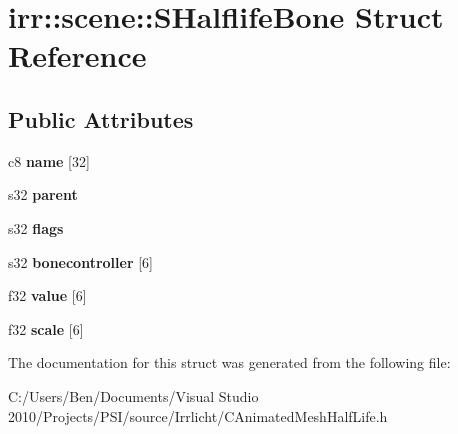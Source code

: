 \hypertarget{structirr_1_1scene_1_1_s_halflife_bone}{\section{irr\-:\-:scene\-:\-:S\-Halflife\-Bone Struct Reference}
\label{structirr_1_1scene_1_1_s_halflife_bone}
}
\subsection*{Public Attributes}
\begin{DoxyCompactItemize}
\item 
\hypertarget{structirr_1_1scene_1_1_s_halflife_bone_ad101b8aea9a2e61d6473b677dbaf8062}{c8 {\bfseries name} \mbox{[}32\mbox{]}}\label{structirr_1_1scene_1_1_s_halflife_bone_ad101b8aea9a2e61d6473b677dbaf8062}

\item 
\hypertarget{structirr_1_1scene_1_1_s_halflife_bone_a8c5e65db08a6ff4079ff3ce72e876af8}{s32 {\bfseries parent}}\label{structirr_1_1scene_1_1_s_halflife_bone_a8c5e65db08a6ff4079ff3ce72e876af8}

\item 
\hypertarget{structirr_1_1scene_1_1_s_halflife_bone_aa1639ebc7be25a83e06cc1a29d9f9a57}{s32 {\bfseries flags}}\label{structirr_1_1scene_1_1_s_halflife_bone_aa1639ebc7be25a83e06cc1a29d9f9a57}

\item 
\hypertarget{structirr_1_1scene_1_1_s_halflife_bone_a411c2d33adb39d9333d2caf2814967cd}{s32 {\bfseries bonecontroller} \mbox{[}6\mbox{]}}\label{structirr_1_1scene_1_1_s_halflife_bone_a411c2d33adb39d9333d2caf2814967cd}

\item 
\hypertarget{structirr_1_1scene_1_1_s_halflife_bone_afb910d6360ca6f096b5c333cdebba175}{f32 {\bfseries value} \mbox{[}6\mbox{]}}\label{structirr_1_1scene_1_1_s_halflife_bone_afb910d6360ca6f096b5c333cdebba175}

\item 
\hypertarget{structirr_1_1scene_1_1_s_halflife_bone_a939c43542b395fe7bdad144d61164ac7}{f32 {\bfseries scale} \mbox{[}6\mbox{]}}\label{structirr_1_1scene_1_1_s_halflife_bone_a939c43542b395fe7bdad144d61164ac7}

\end{DoxyCompactItemize}


The documentation for this struct was generated from the following file\-:\begin{DoxyCompactItemize}
\item 
C\-:/\-Users/\-Ben/\-Documents/\-Visual Studio 2010/\-Projects/\-P\-S\-I/source/\-Irrlicht/C\-Animated\-Mesh\-Half\-Life.\-h\end{DoxyCompactItemize}
